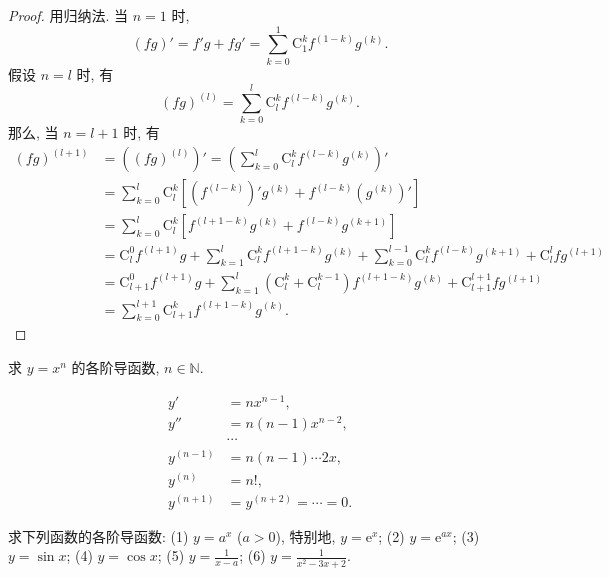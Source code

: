 \begin{proof}
用归纳法. 当 $n = 1$ 时,
\[
(fg)' = f'g + fg' = \sum_{k=0}^{1}\mathrm{C}_{1}^{k}f^{(1-k)}g^{(k)}.
\]
假设 $n = l$ 时, 有
\[
(fg)^{(l)} = \sum_{k=0}^{l}\mathrm{C}_{l}^{k}f^{(l-k)}g^{(k)}.
\]
那么, 当 $n = l+1$ 时, 有
\[
\begin{aligned}
(fg)^{(l+1)} &= ((fg)^{(l)})' = \left(\sum_{k=0}^{l}\mathrm{C}_{l}^{k}f^{(l-k)}g^{(k)}\right)'\\
&= \sum_{k=0}^{l}\mathrm{C}_{l}^{k}\left[(f^{(l-k)})'g^{(k)} + f^{(l-k)}(g^{(k)})'\right]\\
&= \sum_{k=0}^{l}\mathrm{C}_{l}^{k}\left[f^{(l+1-k)}g^{(k)} + f^{(l-k)}g^{(k+1)}\right]\\
&= \mathrm{C}_{l}^{0}f^{(l+1)}g + \sum_{k=1}^{l}\mathrm{C}_{l}^{k}f^{(l+1-k)}g^{(k)} + \sum_{k=0}^{l-1}\mathrm{C}_{l}^{k}f^{(l-k)}g^{(k+1)} + \mathrm{C}_{l}^{l}fg^{(l+1)}\\
&= \mathrm{C}_{l+1}^{0}f^{(l+1)}g + \sum_{k=1}^{l}(\mathrm{C}_{l}^{k} + \mathrm{C}_{l}^{k-1})f^{(l+1-k)}g^{(k)} + \mathrm{C}_{l+1}^{l+1}fg^{(l+1)}\\
&= \sum_{k=0}^{l+1}\mathrm{C}_{l+1}^{k}f^{(l+1-k)}g^{(k)}.
\end{aligned}
\]
\end{proof}

\begin{example}\label{ex:3.2.1}
求 $y = x^{n}$ 的各阶导函数, $n \in \mathbb{N}$.
\end{example}

\begin{solution}
\[
\begin{aligned}
y' &= nx^{n-1},\\
y'' &= n(n-1)x^{n-2},\\
&\cdots\\
y^{(n-1)} &= n(n-1)\cdots2x,\\
y^{(n)} &= n!,\\
y^{(n+1)} &= y^{(n+2)} = \cdots = 0.
\end{aligned}
\]
\end{solution}

\begin{example}\label{ex:3.2.2}
求下列函数的各阶导函数:
(1) $y = a^{x}$ ($a > 0$), 特别地, $y = \mathrm{e}^{x}$; (2) $y = \mathrm{e}^{ax}$;
(3) $y = \sin x$; (4) $y = \cos x$; (5) $y = \frac{1}{x-a}$; (6) $y = \frac{1}{x^{2}-3x+2}$.
\end{example}


